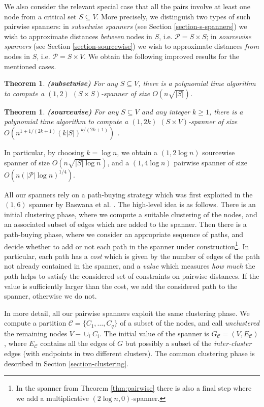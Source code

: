 \documentclass[a4paper,11pt]{article}
\newtheorem{theorem}[lemma]{Theorem}
\theoremstyle{definition}
\newcommand{\cP}{\mathcal{P}}
\newcommand{\cC}{\mathcal{C}}
\begin{document}
We also consider the relevant special case that all the pairs involve at least one node from a critical set $S\subseteq V$. More precisely, we distinguish two types of such pairwise spanners: in \emph{subsetwise spanners} (see Section \ref{section-s-spanners}) we wish to approximate distances \emph{between} nodes in $S$, i.e. $\cP=S\times S$; in \emph{sourcewise spanners} (see Section \ref{section-sourcewise}) we wish to approximate distances \emph{from} nodes in $S$, i.e. $\cP=S\times V$. We obtain the following improved results for the mentioned cases. 

\begin{theorem}
\label{thm:s-spanners} {\bf (subsetwise)}
For any $S\subseteq V$, there is a polynomial time algorithm to compute a $(1,2)$ $(S\times S)$-spanner of size $O(n\sqrt{|S|})$. 
\end{theorem}
\begin{theorem}
\label{thm:sourcewise} {\bf (sourcewise)}
For any $S \subseteq V$ and any integer $k \ge 1$, there is a polynomial time algorithm to compute a $(1,2k)$ $(S\times V)$-spanner of size $O(n^{1+1/(2k+1)}(k|S|)^{k/(2k+1)})$ .
\end{theorem}


In particular, by choosing $k= \log n$, we obtain a $(1,2\log n)$ sourcewise spanner of size  $O(n\sqrt{|S|\log n})$, and a 
$(1,4\log n)$ pairwise spanner of size
$O(n(|\cP|\log n)^{1/4})$.

All our spanners rely on a path-buying strategy which was first exploited in the $(1,6)$ spanner by Baswana et al. \cite{BKMP05}.
The high-level idea is as follows. There is an initial clustering phase, where we compute a suitable clustering of the nodes, and an associated subset of edges which are added to the spanner. Then there is a path-buying phase, where we consider an appropriate sequence of paths, and decide whether to add or not each path in the spanner under construction\footnote{In the spanner from Theorem \ref{thm:pairwise} there is also a final step where we add a  multiplicative $(2\log n,0)$-spanner.}. In particular, each path has a \emph{cost}  which is given by the number of edges of the path not already contained in the spanner, and a \emph{value} which measures \emph{how much} the path helps to satisfy the considered set of constraints on pairwise distances. If the value is sufficiently larger than the cost, we add the considered path to the spanner, otherwise we do not.

In more detail, all our pairwise spanners exploit the same clustering phase. We compute a partition $\cC=\{C_1,\ldots,C_q\}$ of a subset of the nodes, and call \emph{unclustered} the remaining nodes $V-\cup_i C_i$. The initial value of the spanner is $G_{\cC}=(V,E_{\cC})$, where $E_{\cC}$ contains all the edges of $G$ but possibly a subset of the \emph{inter-cluster} edges (with endpoints in two different clusters).
The common clustering phase is described in Section \ref{section-clustering}.
\end{document}
